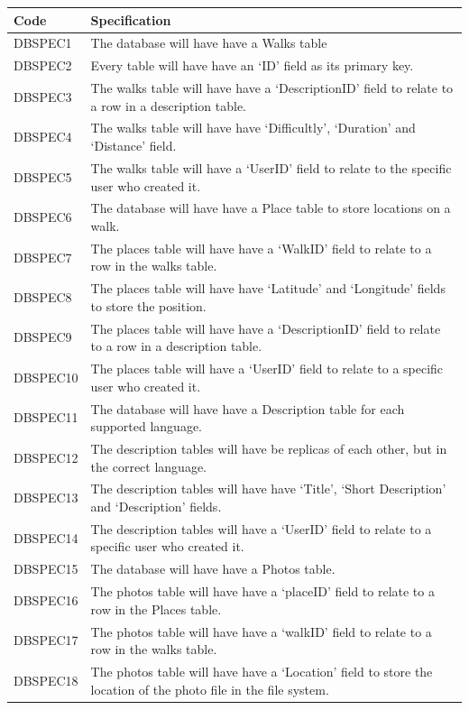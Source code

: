 \documentclass[11pt,a4paper]{article}
\begin{document}
\begin{longtable}{|p{2.5cm}p{13cm}|}
\hline
\textbf{Code} & \textbf{Specification} \\
\hline
DBSPEC1 & The database will have have a Walks table\\ \hline
DBSPEC2 & Every table will have have an `ID' field as its primary key.\\ \hline
DBSPEC3 & The walks table will have have a `DescriptionID' field to relate to a row in a description table. \\ \hline
DBSPEC4 & The walks table will have have `Difficultly',  `Duration' and `Distance' field. \\ \hline
DBSPEC5 & The walks table will have a `UserID' field to relate to the specific user who created it. \\ \hline
DBSPEC6 & The database will have have a Place table to store locations on a walk.\\ \hline
DBSPEC7 & The places table will have have a `WalkID' field to relate to a row in the walks table.\\ \hline
DBSPEC8 & The places table will have have `Latitude' and `Longitude'  fields to store the position. \\ \hline
DBSPEC9 & The places table will have have a `DescriptionID' field to relate to a row in a description table. \\ \hline
DBSPEC10 & The places table will have a `UserID' field to relate to a specific user who created it. \\\hline
DBSPEC11 & The database will have have a Description table for each supported language. \\ \hline
DBSPEC12 & The description tables will have be replicas of each other, but in the correct language. \\ \hline
DBSPEC13 & The description tables will have have `Title', `Short Description' and `Description' fields.\\ \hline
DBSPEC14 & The description tables will have a `UserID' field to relate to a specific user who created it. \\\hline
DBSPEC15 & The database will have have a Photos table.\\ \hline
DBSPEC16 & The photos table will have have a `placeID' field to relate to a row in the Places table. \\ \hline
DBSPEC17 & The photos table will have have a `walkID' field to relate to a row in the walks table.\\ \hline
DBSPEC18 & The photos table will have have a `Location' field to store the location of the photo file in the file system.\\ \hline

\end{longtable}
\end{document}
